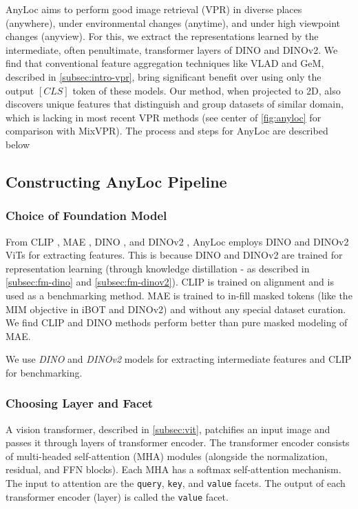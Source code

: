 AnyLoc aims to perform good image retrieval (VPR) in diverse places
(anywhere), under environmental changes (anytime), and under high
viewpoint changes (anyview). For this, we extract the representations
learned by the intermediate, often penultimate, transformer layers of
DINO and DINOv2. We find that conventional feature aggregation
techniques like VLAD and GeM, described in \cref{subsec:intro-vpr},
bring significant benefit over using only the output
$\left[CLS\right]$ token of these models. Our method, when projected
to 2D, also discovers unique features that distinguish and group
datasets of similar domain, which is lacking in most recent VPR
methods (see center of \cref{fig:anyloc} for comparison with MixVPR).
The process and steps for AnyLoc are described below

\subsection{Constructing AnyLoc Pipeline}
\label{subsec:anyloc-pipeline}

\subsubsection{Choice of Foundation Model}

From CLIP \cite{Radford2021LearningTV}, MAE \cite{He2021MaskedAA},
DINO \cite{Caron2021EmergingPI}, and DINOv2 \cite{Oquab2023DINOv2LR},
AnyLoc employs DINO and DINOv2 ViTs for extracting features. This is
because DINO and DINOv2 are trained for representation learning
(through knowledge distillation - as described in
\cref{subsec:fm-dino} and \cref{subsec:fm-dinov2}). CLIP is trained
on alignment and is used as a benchmarking method. MAE is trained to
in-fill masked tokens (like the MIM objective in iBOT and DINOv2) and 
without any special dataset curation. We find CLIP and DINO methods
perform better than pure masked modeling of MAE.

We use \emph{DINO} and \emph{DINOv2} models for extracting
intermediate features and CLIP for benchmarking.

\subsubsection{Choosing Layer and Facet}

A vision transformer, described in \cref{subsec:vit}, patchifies an
input image and passes it through layers of transformer encoder. The
transformer encoder consists of multi-headed self-attention (MHA)
modules (alongside the normalization, residual, and FFN blocks). Each
MHA has a softmax self-attention mechanism. The input to attention
are the \texttt{query}, \texttt{key}, and \texttt{value} facets. The
output of each transformer encoder (layer) is called the 
\texttt{value} facet.

